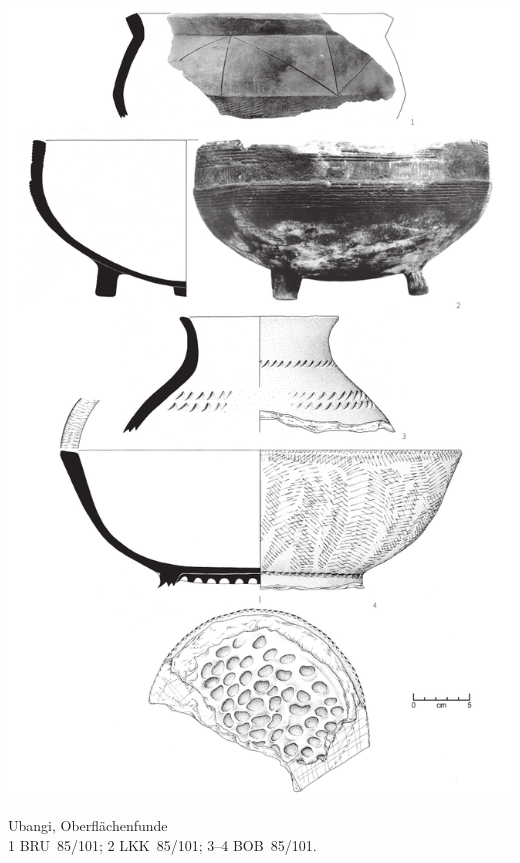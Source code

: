 \clearpage
{} %
\pagestyle{plain}
\begin{pl}[H]
	\includegraphics{plt/Taf1.pdf}
	\vspace{.75em}\caption{\mbox{Ubangi}, Oberflächenfunde \\ 1 BRU~85/101; 2 LKK~85/101; 3--4 BOB~85/101.}
	\label{pl:1}
\end{pl}

